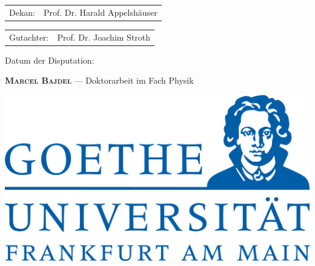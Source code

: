 \documentclass{cd-cover}
\begin{document}
\begin{bookletsheets}
        \noindent{}%
        \begin{tabular}{@{}l@{\hskip 1ex}l}
        Dekan: & Prof. Dr. Harald Appelshäuser
        \end{tabular}

        \vspace*{2mm}

        \noindent{}%
        \begin{tabular}{@{}l@{\hskip 1ex}l}
        Gutachter: & Prof. Dr. Joachim Stroth
        \end{tabular}

        \vspace*{2cm}
        \noindent{}%
        Datum der Disputation:
    \end{bookletsheets}
    
    \begin{backsheet*}{\hspace{16.8mm}\textsc{\textbf{Marcel Bajdel}} --- \textsf{Doktorarbeit im Fach Physik}}
        \vspace*{0.2\textheight}
        \begin{center}
            \includegraphics[scale=0.1]{Logo}
        \end{center}
    \end{backsheet*}

    
    
\end{document}
